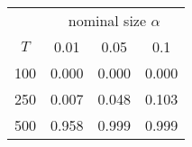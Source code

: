 % 
\begin{tabular}{cccc}
  \hline
  & \multicolumn{3}{c}{nominal size $\alpha$} \\
 $T$ & 0.01 & 0.05 & 0.1 \\
 \hline
100 & 0.000 & 0.000 & 0.000 \\ 
  250 & 0.007 & 0.048 & 0.103 \\ 
  500 & 0.958 & 0.999 & 0.999 \\ 
   \hline
\end{tabular}
